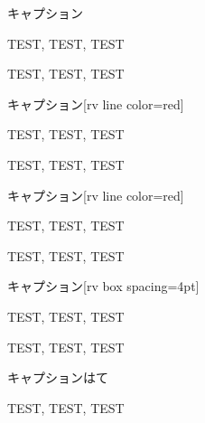 \begin{rv@ascolorbox1@caption}{キャプション}

TEST, TEST, TEST

\end{rv@ascolorbox1@caption}

\begin{rv@ascolorbox1@nocaption}

TEST, TEST, TEST

\end{rv@ascolorbox1@nocaption}

\begin{rv@ascolorbox2@caption}{キャプション}[rv line color=red]

TEST, TEST, TEST

\end{rv@ascolorbox2@caption}

\begin{rv@ascolorbox2@nocaption}

TEST, TEST, TEST

\end{rv@ascolorbox2@nocaption}

\begin{rv@ascolorbox3@caption}{キャプション}[rv line color=red]

TEST, TEST, TEST

\end{rv@ascolorbox3@caption}

\begin{rv@ascolorbox3@nocaption}[rv dummy caption=ほげほげほげほげ, rv line color=red]

TEST, TEST, TEST

\end{rv@ascolorbox3@nocaption}

\begin{rv@ascolorbox4@caption}{キャプション}[rv box spacing=4pt]

TEST, TEST, TEST

\end{rv@ascolorbox4@caption}

\begin{rv@ascolorbox4@nocaption}

TEST, TEST, TEST

\end{rv@ascolorbox4@nocaption}

\begin{rv@ascolorbox5@caption}{キャプションはて}

TEST, TEST, TEST

\end{rv@ascolorbox5@caption}

